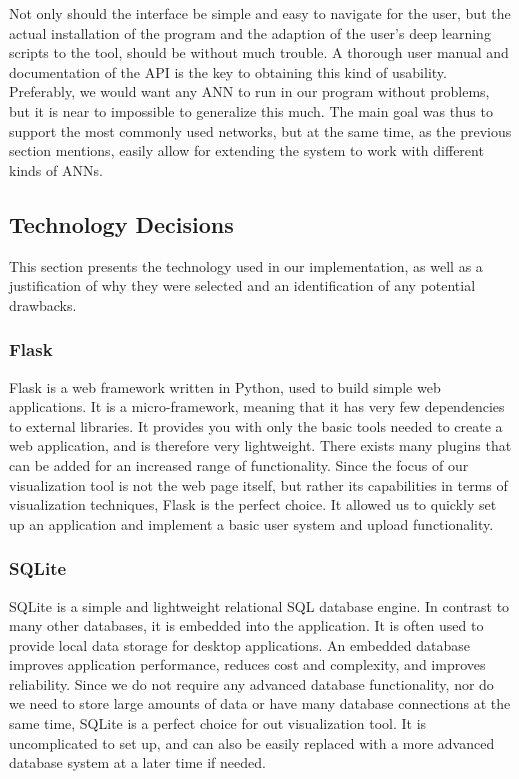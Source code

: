 Not only should the interface be simple and easy to navigate for the user, but the actual installation of the program and the adaption of the user's deep learning scripts to the tool, should be without much trouble. A thorough user manual and documentation of the API is the key to obtaining this kind of usability. Preferably, we would want any ANN to run in our program without problems, but it is near to impossible to generalize this much. The main goal was thus to support the most commonly used networks, but at the same time, as the previous section mentions, easily allow for extending the system to work with different kinds of ANNs.

\subsection{Technology Decisions}

This section presents the technology used in our implementation, as well as a justification of why they were selected and an identification of any potential drawbacks.

\subsubsection{Flask}

Flask is a web framework written in Python, used to build simple web applications. It is a micro-framework, meaning that it has very few dependencies to external libraries. It provides you with only the basic tools needed to create a web application, and is therefore very lightweight. There exists many plugins that can be added for an increased range of functionality. Since the focus of our visualization tool is not the web page itself, but rather its capabilities in terms of visualization techniques, Flask is the perfect choice. It allowed us to quickly set up an application and implement a basic user system and upload functionality.

\subsubsection{SQLite}

SQLite is a simple and lightweight relational SQL database engine. In contrast to many other databases, it is embedded into the application. It is often used to provide local data storage for desktop applications. An embedded database improves application performance, reduces cost and complexity, and improves reliability. Since we do not require any advanced database functionality, nor do we need to store large amounts of data or have many database connections at the same time, SQLite is a perfect choice for out visualization tool. It is uncomplicated to set up, and can also be easily replaced with a more advanced database system at a later time if needed.

